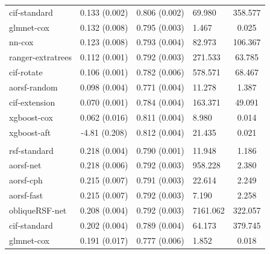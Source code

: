 \documentclass[twoside,11pt]{article}\usepackage[]{graphicx}\usepackage[]{xcolor}
\newenvironment{knitrout}{}{} %
\begin{document}
\begin{knitrout}
\begin{longtable}[t]{lcclc}
\hspace{1em}cif-standard & 0.133 (0.002) & 0.806 (0.002) & 69.980 & 358.577\\
\hspace{1em}glmnet-cox & 0.132 (0.008) & 0.795 (0.003) & 1.467 & 0.025\\
\hspace{1em}nn-cox & 0.123 (0.008) & 0.793 (0.004) & 82.973 & 106.367\\
\hspace{1em}ranger-extratrees & 0.112 (0.001) & 0.792 (0.003) & 271.533 & 63.785\\
\hspace{1em}cif-rotate & 0.106 (0.001) & 0.782 (0.006) & 578.571 & 68.467\\
\hspace{1em}aorsf-random & 0.098 (0.004) & 0.771 (0.004) & 11.278 & 1.387\\
\hspace{1em}cif-extension & 0.070 (0.001) & 0.784 (0.004) & 163.371 & 49.091\\
\hspace{1em}xgboost-cox & 0.062 (0.016) & 0.811 (0.004) & 8.980 & 0.014\\
\hspace{1em}xgboost-aft & -4.81 (0.208) & 0.812 (0.004) & 21.435 & 0.021\\
\addlinespace[0.3em]
\hline
\multicolumn{5}{l}{\textit{\textbf{ARIC; death, n = 13623, p = 41}}}\\
\hline
\hspace{1em}rsf-standard & 0.218 (0.004) & 0.790 (0.001) & 11.948 & 1.186\\
\hspace{1em}aorsf-net & 0.218 (0.006) & 0.792 (0.003) & 958.228 & 2.380\\
\hspace{1em}aorsf-cph & 0.215 (0.007) & 0.791 (0.003) & 22.614 & 2.249\\
\hspace{1em}aorsf-fast & 0.215 (0.007) & 0.792 (0.003) & 7.190 & 2.258\\
\hspace{1em}obliqueRSF-net & 0.208 (0.004) & 0.792 (0.003) & 7161.062 & 322.057\\
\hspace{1em}cif-standard & 0.202 (0.004) & 0.789 (0.004) & 64.173 & 379.745\\
\hspace{1em}glmnet-cox & 0.191 (0.017) & 0.777 (0.006) & 1.852 & 0.018\\

\end{longtable}
\end{knitrout}
\end{document}
